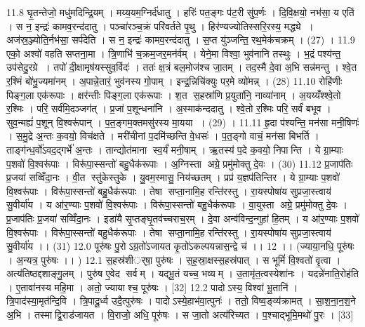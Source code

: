 11.8
घृ॒तन्तेजो॒ मधु॑मदिन्द्रि॒यम् । मय्य॒यम॒ग्निर्द॑धातु । हरिः॑ पत॒ङ्गः प॑ट॒री सु॑प॒र्णः । दि॒वि॒क्षयो॒ नभ॑सा॒ य एति॑ । स न॒ इन्द्रः॑ कामव॒रन्द॑दातु । पञ्चा॑रञ्च॒क्रं परि॑वर्तते पृ॒थु । हिर॑ण्यज्योतिस्सरि॒रस्य॒ मद्ध्ये । अज॑स्र॒ञ्ज्योति॒र्नभ॑सा॒ सर्प॑देति । स न॒ इन्द्रः॑ कामव॒रन्द॑दातु । स॒प्त यु॑ञ्जन्ति॒ रथ॒मेक॑चक्रम् । (27) ।
11.9
एको॒ अश्वो॑ वहति सप्तना॒मा । त्रि॒णाभि॑ च॒क्रम॒जर॒मन॑र्वम् । येने॒मा विश्वा॒ भुव॑नानि तस्थुः । भ॒द्रं पश्य॑न्त॒ उप॑सेदु॒रग्रे । तपो॑ दी॒क्षामृष॑यस्सुव॒र्विदः॑ । ततः॑ क्ष॒त्रं बल॒मोज॑श्च जा॒तम् । तद॒स्मै दे॒वा अ॒भि सन्न॑मन्तु । श्वे॒त र॒श्मिं बो॑भु॒ज्यमा॑नम् । अ॒पान्ने॒तारं॒ भुव॑नस्य गो॒पाम् । इन्द्र॒न्निचि॑क्युः पर॒मे व्यो॑मन्न् । (28)
11.10
रोहि॑णीः पिङ्ग॒ला एक॑रूपाः । क्षर॑न्तीः पिङ्ग॒ला एक॑रूपाः । श॒त स॒हस्रा॑णि प्र॒युता॑नि॒ नाव्या॑नाम् । अ॒यय्यँश्श्वे॒तो र॒श्मिः । परि॒ सर्व॑मि॒दञ्जग॑त् । प्र॒जां प॒शून्धना॑नि । अ॒स्माक॑न्ददातु । श्वे॒तो र॒श्मिः परि॒ सर्वं॑ बभूव । सुव॒न्मह्यं॑ प॒शून् वि॒श्वरू॑पान् । प॒त॒ङ्गम॒क्तमसु॑रस्य मा॒यया । (29) ।
11.11
हृ॒दा प॑श्यन्ति॒ मन॑सा मनी॒षिणः॑ । स॒मु॒द्रे अ॒न्तः क॒वयो॒ विच॑क्षते । मरी॑चीनां प॒दमि॑च्छन्ति वे॒धसः॑ । प॒त॒ङ्गो वाचं॒ मन॑सा बिभर्ति । ताङ्ग॑न्ध॒र्वो॑ऽवद॒द्गर्भे॑ अ॒न्तः । तान्द्योत॑माना स्व॒र्यं॑ मनी॒षाम् । ऋ॒तस्य॑ प॒दे क॒वयो॒ निपान्ति । ये ग्रा॒म्याः प॒शवो॑ वि॒श्वरू॑पाः । विरू॑पा॒स्सन्तो॑ बहु॒धैक॑रूपाः । अ॒ग्निस्ता अग्रे॒ प्रमु॑मोक्तु दे॒वः । (30)
11.12
प्र॒जाप॑तिः प्र॒जया॑ सव्विँदा॒नः । वी॒त स्तु॑केस्तुके । यु॒वम॒स्मासु॒ निय॑च्छतम् । प्रप्र॑ य॒ज्ञप॑तिन्तिर । ये ग्रा॒म्याः प॒शवो॑ वि॒श्वरू॑पाः । विरू॑पा॒स्सन्तो॑ बहु॒धैक॑रूपाः । तेषा॑ सप्ता॒नामि॒ह रन्ति॑रस्तु । रा॒यस्पोषा॑य सुप्रजा॒स्त्वाय॑ सु॒वीर्या॑य । य आ॑र॒ण्याः प॒शवो॑ वि॒श्वरू॑पाः । विरू॑पा॒स्सन्तो॑ बहु॒धैक॑रूपाः । वा॒युस्ता अग्रे॒ प्रमु॑मोक्तु दे॒वः । प्र॒जाप॑तिः प्र॒जया॑ सव्विँदा॒नः । इडा॑यै सृ॒प्तङ्घृ॒तव॑च्चराच॒रम् । दे॒वा अन्व॑विन्द॒न्गुहा॑ हि॒तम् । य आ॑र॒ण्याः प॒शवो॑ वि॒श्वरू॑पाः । विरू॑पा॒स्सन्तो॑ बहु॒धैक॑रूपाः । तेषा॑ सप्ता॒नामि॒ह रन्ति॑रस्तु । रा॒यस्पोषा॑य सुप्रजा॒स्त्वाय॑ सु॒वीर्या॑य ।। (31)
12.0
पूरु॑षः पु॒रोऽग्र॒तो॑ऽजायत कृ॒तो॑ऽकल्पयन्नास॒न्द्वे च॑ ।। 12 ।। (ज्याया॒नधि॒ पूरु॑षः । अ॒न्यत्र॒ पुरु॑षः ।। )
12.1
स॒हस्र॑शीर््षा॒ पुरु॑षः । स॒ह॒स्रा॒क्षस्स॒हस्र॑पात् । स भूमिं॑ वि॒श्वतो॑ वृ॒त्वा । अत्य॑तिष्ठद्दशाङ्गु॒लम् । पुरु॑ष ए॒वेद सर्वम् । यद्भू॒तं यच्च॒ भव्यम् । उ॒तामृ॑त॒त्वस्येशा॑नः । यदन्ने॑नाति॒रोह॑ति । ए॒तावा॑नस्य महि॒मा । अतो॒ ज्याया॑श्च॒ पूरु॑षः । [32]
12.2
पादोऽस्य॒ विश्वा॑ भू॒तानि॑ । त्रि॒पाद॑स्या॒मृत॑न्दि॒वि । त्रि॒पादू॒र्ध्व उदै॒त्पुरु॑षः । पादोऽस्ये॒हाभ॑वा॒त्पुनः॑ । ततो॒ विष्व॒ङ्व्य॑क्रामत् । सा॒श॒ना॒न॒श॒ने अ॒भि । तस्माद्वि॒राड॑जायत । वि॒राजो॒ अधि॒ पूरु॑षः । स जा॒तो अत्य॑रिच्यत । प॒श्चाद्भूमि॒मथो॑ पु॒रः । [33]
